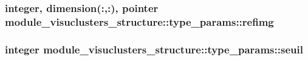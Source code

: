 \subsubsection[{refimg}]{\setlength{\rightskip}{0pt plus 5cm}integer, dimension(\+:,\+:), pointer module\+\_\+visuclusters\+\_\+structure\+::type\+\_\+params\+::refimg}\label{structmodule__visuclusters__structure_1_1type__params_aac8aed43c2a6498a0cda0fa76a29615a}
\hypertarget{structmodule__visuclusters__structure_1_1type__params_a3cd977202ff5db7cd0db292d654aa68f}{}
\subsubsection[{seuil}]{\setlength{\rightskip}{0pt plus 5cm}integer module\+\_\+visuclusters\+\_\+structure\+::type\+\_\+params\+::seuil}\label{structmodule__visuclusters__structure_1_1type__params_a3cd977202ff5db7cd0db292d654aa68f}
